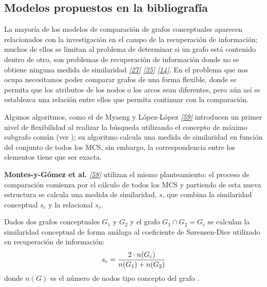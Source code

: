 \documentclass[a4paper,12pt,spanish]{book}
\begin{document}
\subsection{Modelos propuestos en la bibliografía}
\label{1.state-of-the-art/iii.distancia-semantica:modelos-propuestos-en-la-bibliografia}
La mayoría de los modelos de comparación de grafos conceptuales aparecen relacionados con
la investigación en el campo de la recuperación de información; muchos de ellos se limitan
al problema de determinar si un grafo está contenido dentro de otro, son problemas de
recuperación de información donde no se obtiene ninguna medida de similaridad \label{1.state-of-the-art/iii.distancia-semantica:id10}{\hyperref[zreferences:ellis1994]{\emph{{[}27{]}}}} \label{1.state-of-the-art/iii.distancia-semantica:id11}{\hyperref[zreferences:huibers1996]{\emph{{[}35{]}}}} \label{1.state-of-the-art/iii.distancia-semantica:id12}{\hyperref[zreferences:cardenosa2013]{\emph{{[}14{]}}}}.
En el problema que nos ocupa necesitamos poder comparar grafos de una forma flexible, donde se
permita que los atributos de los nodos o los arcos sean diferentes, pero aún así se establezca
una relación entre ellos que permita continuar con la comparación.

Algunos algoritmos, como el de Myaeng y López-López \label{1.state-of-the-art/iii.distancia-semantica:id13}{\hyperref[zreferences:myaeng1992]{\emph{{[}59{]}}}} introducen un primer
nivel de flexibilidad al realizar la búsqueda utilizando el concepto de máximo subgrafo común
(ver {\hyperref[1.state-of-the-art/ii.medidas-distancia:maximo-grafo-comun]{\emph{}}}); su algoritmo calcula una medida de similaridad
en función del conjunto de todos los MCS, sin embargo, la correspondencia entre los elementos
tiene que ser exacta.

\textbf{Montes-y-Gómez et al.} \label{1.state-of-the-art/iii.distancia-semantica:id14}{\hyperref[zreferences:montes2000]{\emph{{[}58{]}}}} utilizan el mismo planteamiento: el
proceso de comparación comienza por el cálculo de todos los MCS y partiendo de esta nueva
estructura se calcula una medida de similaridad, \(s\), que combina la similaridad
conceptual \(s_c\) y la relacional \(s_r\).

Dados dos grafos conceptuales \(G_1\) y \(G_2\) y el grafo \(G_1 \cap G_2 = G_c\)
se calculan la similaridad conceptual de forma análaga al coeficiente de Sørensen-Dice
utilizado en recuperación de información:
\begin{gather}
\begin{split}s_c = \frac{2 \cdot n(G_c)}{n(G_1) + n(G_2)}\end{split}\notag
\end{gather}
donde \(n(G)\) es el número de nodos tipo concepto del grafo .
\end{document}
